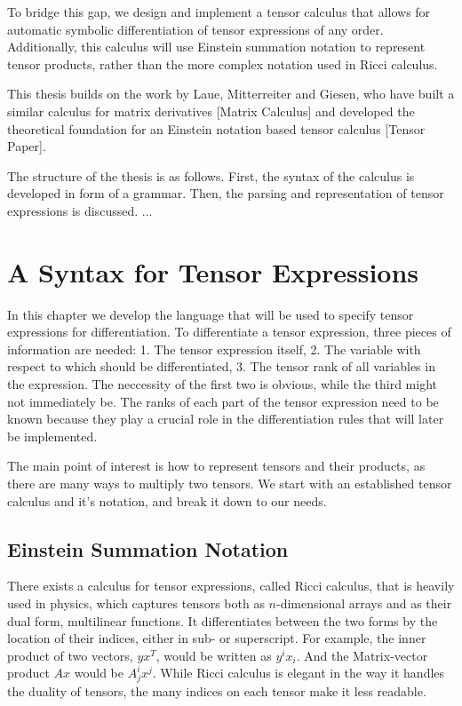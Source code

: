 \documentclass[12pt, a4paper]{report}
\begin{document}
To bridge this gap, we design and implement a tensor calculus that allows for automatic symbolic differentiation of tensor expressions of any order.
Additionally, this calculus will use Einstein summation notation to represent tensor products, rather than the more complex notation used in Ricci calculus.

This thesis builds on the work by Laue, Mitterreiter and Giesen, who have built a similar calculus for matrix derivatives [Matrix Calculus] and developed the theoretical foundation for an Einstein notation based tensor calculus [Tensor Paper].

The structure of the thesis is as follows.
First, the syntax of the calculus is developed in form of a grammar.
Then, the parsing and representation of tensor expressions is discussed.
...

\chapter{A Syntax for Tensor Expressions}
In this chapter we develop the language that will be used to specify tensor expressions for differentiation.
To differentiate a tensor expression, three pieces of information are needed: 1. The tensor expression itself, 2. The variable with respect to which should be differentiated, 3. The tensor rank of all variables in the expression.
The neccessity of the first two is obvious, while the third might not immediately be.
The ranks of each part of the tensor expression need to be known because they play a crucial role in the differentiation rules that will later be implemented.

The main point of interest is how to represent tensors and their products, as there are many ways to multiply two tensors.
We start with an established tensor calculus and it's notation, and break it down to our needs.

\section{Einstein Summation Notation}
There exists a calculus for tensor expressions, called Ricci calculus, that is heavily used in physics, which captures tensors both as $n$-dimensional arrays and as their dual form, multilinear functions.
It differentiates between the two forms by the location of their indices, either in sub- or superscript.
For example, the inner product of two vectors, $yx^T$, would be written as $y^ix_i$. And the Matrix-vector product $Ax$ would be $A^i_jx^j$.
While Ricci calculus is elegant in the way it handles the duality of tensors, the many indices on each tensor make it less readable.
\end{document}

